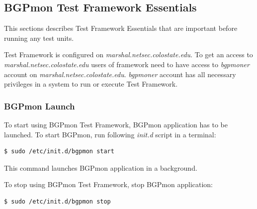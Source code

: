 
\subsection{BGPmon Test Framework Essentials}
\label{sec:essentials}

This sections describes Test Framework Essentials that are important before running any test units. 

Test Framework is configured on \emph{marshal.netsec.colostate.edu}. To get an access to \emph{marshal.netsec.colostate.edu} users of framework need to have access to \emph{bgpmoner} account on \emph{marshal.netsec.colostate.edu}. \emph{bgpmoner} account has all necessary privileges in a system to run or execute Test Framework.  

\subsubsection{BGPmon Launch}

To start using BGPmon Test Framework, BGPmon application has to be launched. To start BGPmon, run following  \emph{init.d} script in a terminal:

\begin{verbatim}
$ sudo /etc/init.d/bgpmon start
\end{verbatim}

This command launches BGPmon application in a background.

To stop using BGPmon Test Framework, stop  BGPmon application:

\begin{verbatim}
$ sudo /etc/init.d/bgpmon stop
\end{verbatim}

